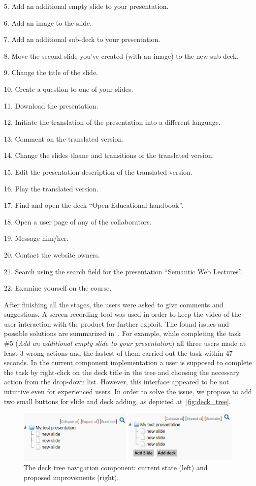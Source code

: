 \documentclass[PhD, Submit, ngerman,UKenglish,table]{scrbook}
\begin{document}
5. Add an additional empty slide to your presentation.

6. Add an image to the slide.

7. Add an additional sub-deck to your presentation.

8. Move the second slide you've created (with an image) to the new sub-deck.

9. Change the title of the slide.

10. Create a question to one of your slides.

11. Download the presentation.

12. Initiate the translation of the presentation into a different language.

13. Comment on the translated version.

14. Change the slides theme and transitions of the translated version.

15. Edit the presentation description of the translated version.

16. Play the translated version.

17. Find and open the deck ``Open Educational handbook''.

18. Open a user page of any of the collaborators.

19. Message him/her.

20. Contact the website owners.

21. Search using the search field for the presentation ``Semantic Web Lectures''.

22. Examine yourself on the course.


After finishing all the stages, the users were asked to give comments and suggestions.
A screen recording tool was used in order to keep the video of the user interaction with the product for further exploit.
The found issues and possible solutions are summarized in~\cite{hasanov2015measuring}. 
For example, while completing the task \#5 (\textit{Add an additional empty slide to your presentation}) all three users made at least 3 wrong actions and the fastest of them carried out the task within 47 seconds. 
In the current component implementation a user is supposed to complete the task by right-click on the deck title in the tree and choosing the necessary action from the drop-down list. 
However, this interface appeared to be not intuitive even for experienced users.
In order to solve the issue, we propose to add two small buttons for slide and deck adding, as depicted at~\autoref{fig:deck_tree}.

\begin{figure}[ht!]
	\centering
		\includegraphics[width=\columnwidth]{images/deck_tree_mockup.png}
	\caption{The deck tree navigation component: current state (left) and proposed improvements (right).}
	\label{fig:deck_tree}
\end{figure}
\end{document}
